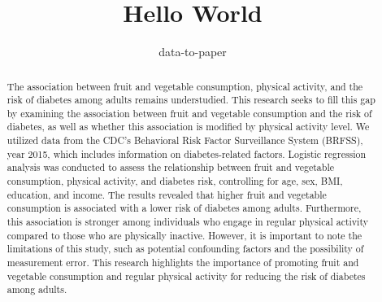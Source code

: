 \documentclass[12pt]{article}
\title{Hello World}
\author{data-to-paper}
\begin{document}
\maketitle

\begin{abstract}
The association between fruit and vegetable consumption, physical activity, and the risk of diabetes among adults remains understudied. This research seeks to fill this gap by examining the association between fruit and vegetable consumption and the risk of diabetes, as well as whether this association is modified by physical activity level. We utilized data from the CDC's Behavioral Risk Factor Surveillance System (BRFSS), year 2015, which includes information on diabetes-related factors. Logistic regression analysis was conducted to assess the relationship between fruit and vegetable consumption, physical activity, and diabetes risk, controlling for age, sex, BMI, education, and income. The results revealed that higher fruit and vegetable consumption is associated with a lower risk of diabetes among adults. Furthermore, this association is stronger among individuals who engage in regular physical activity compared to those who are physically inactive. However, it is important to note the limitations of this study, such as potential confounding factors and the possibility of measurement error. This research highlights the importance of promoting fruit and vegetable consumption and regular physical activity for reducing the risk of diabetes among adults.
\end{abstract}
\end{document}
